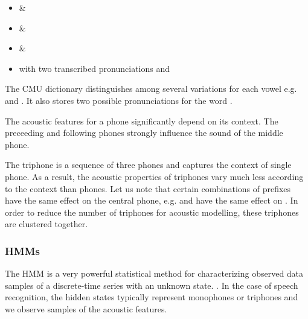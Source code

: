\begin{itemize}
    \item {} \& 
    \item {} \& 
    \item {} \& 
    \item {} with two transcribed pronunciations  and 
\end{itemize}

The CMU dictionary distinguishes among several variations for each vowel e.g.  and . It also stores two possible pronunciations for the word .

The acoustic features for a phone significantly depend on its context. The preceeding and following phones strongly influence the sound of the middle phone.

The triphone is a sequence of three phones and captures the context of single phone. As a result, the acoustic properties of triphones vary much less according to the context than phones. Let us note that certain combinations of prefixes have the same effect on the central phone, e.g.  and  have the same effect on . In order to reduce the number of triphones for acoustic modelling, these triphones are clustered together.



%     
%     

\subsubsection*{\acfp{HMM}}
The \ac{HMM} is a very powerful statistical method for characterizing observed data samples of a discrete-time series with an unknown state. \cite{huang2001spoken}. In the case of speech recognition, the hidden states typically represent monophones or triphones and we observe samples of the acoustic features.

